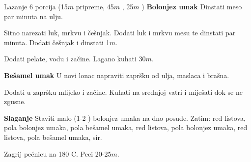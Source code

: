 \documentclass[a4paper]{article}
\begin{document}
\begin{recipe}{Lazanje}%
  {6 porcija}%
  { (15$m$ pripreme, 45$m$ \fryingpan, 25$m$ \oven )}
\ingredient[]{}{\fryingpan}
  {\bf Bolonjez umak}\newline
  Dinstati meso par minuta na ulju.

  Sitno narezati luk, mrkvu i češnjak. Dodati luk i mrkvu mesu te dinstati par
  minuta. Dodati češnjak i dinstati 1$m$.

  Dodati pelate, vodu i začine. Lagano kuhati 30$m$.

\ingredient[]{}{\pot}
  {\bf Bešamel umak}\newline
  U novi lonac napraviti zapršku od ulja, maslaca i brašna.

  Dodati u zapršku mlijeko i začine. Kuhati na srednjoj vatri i miješati dok se
  ne zgusne.

\ingredient[]{}{\pan}
  {\bf Slaganje}\newline
  Staviti malo (1-2 \Spoon) bolonjez umaka na dno posude. Zatim:
    red listova,
    pola bolonjez umaka,
    pola bešamel umaka,
    red listova,
    pola bolonjez umaka,
    red listova,
    pola bešamel umaka,
    sir.

\ingredient[]{}{\oven}
  Zagrij pećnicu na 180\0 C. Peci 20-25$m$.

\end{recipe}
\end{document}
